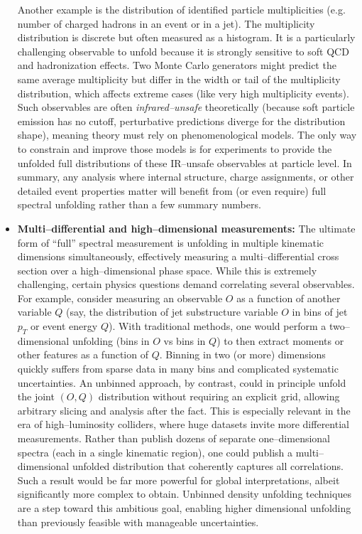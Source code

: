 \begin{itemize}
            Another example is the distribution of identified particle multiplicities (e.g. number of charged hadrons in an event or in a jet).
            The multiplicity distribution is discrete but often measured as a histogram.
            It is a particularly challenging observable to unfold because it is strongly sensitive to soft QCD and hadronization effects.
            Two Monte Carlo generators might predict the same average multiplicity but differ in the width or tail of the multiplicity distribution, which affects extreme cases (like very high multiplicity events).
            Such observables are often \emph{infrared--unsafe} theoretically (because soft particle emission has no cutoff, perturbative predictions diverge for the distribution shape), meaning theory must rely on phenomenological models.
            The only way to constrain and improve those models is for experiments to provide the unfolded full distributions of these IR--unsafe observables at particle level.
            In summary, any analysis where internal structure, charge assignments, or other detailed event properties matter will benefit from (or even require) full spectral unfolding rather than a few summary numbers.
        \item \textbf{Multi--differential and high--dimensional measurements:}
            The ultimate form of “full” spectral measurement is unfolding in multiple kinematic dimensions simultaneously, effectively measuring a multi--differential cross section over a high--dimensional phase space.
            While this is extremely challenging, certain physics questions demand correlating several observables.
            For example, consider measuring an observable $O$ as a function of another variable $Q$ (say, the distribution of jet substructure variable $O$ in bins of jet $p_T$ or event energy $Q$).
            With traditional methods, one would perform a two--dimensional unfolding (bins in $O$ vs bins in $Q$) to then extract moments or other features as a function of $Q$.
            Binning in two (or more) dimensions quickly suffers from sparse data in many bins and complicated systematic uncertainties.
            An unbinned approach, by contrast, could in principle unfold the joint $(O,Q)$ distribution without requiring an explicit grid, allowing arbitrary slicing and analysis after the fact.
            This is especially relevant in the era of high--luminosity colliders, where huge datasets invite more differential measurements.
            Rather than publish dozens of separate one--dimensional spectra (each in a single kinematic region), one could publish a multi--dimensional unfolded distribution that coherently captures all correlations.
            Such a result would be far more powerful for global interpretations, albeit significantly more complex to obtain.
            Unbinned density unfolding techniques are a step toward this ambitious goal, enabling higher dimensional unfolding than previously feasible with manageable uncertainties.
    \end{itemize}
